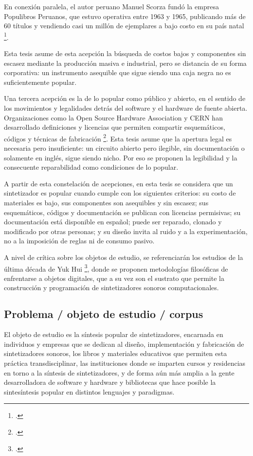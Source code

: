\documentclass[../candidatura.tex]{subfiles}
\begin{document}
En conexión paralela, el autor peruano Manuel Scorza fundó la empresa Populibros Peruanos, que estuvo operativa entre 1963 y 1965, publicando más de 60 títulos y vendiendo casi un millón de ejemplares a bajo costo en su país natal \footcite{aguirre_populibros_2017}.

Esta tesis asume de esta acepción la búsqueda de costos bajos y componentes sin escasez mediante la producción masiva e industrial, pero se distancia de su forma corporativa: un instrumento asequible que sigue siendo una caja negra no es suficientemente popular.

Una tercera acepción es la de lo popular como público y abierto, en el sentido de los movimientos y legalidades detrás del software y el hardware de fuente abierta. Organizaciones como la Open Source Hardware Association y CERN han desarrollado definiciones y licencias que permiten compartir esquemáticos, códigos y técnicas de fabricación \footcites{oshwa_about_sinfecha}{cern_ohl_sinfecha}. Esta tesis asume que la apertura legal es necesaria pero insuficiente: un circuito abierto pero ilegible, sin documentación o solamente en inglés, sigue siendo nicho. Por eso se proponen la legibilidad y la consecuente reparabilidad como condiciones de lo popular.

A partir de esta constelación de acepciones, en esta tesis se considera que un sintetizador es popular cuando cumple con los siguientes criterios: su costo de materiales es bajo, sus componentes son asequibles y sin escasez; sus esquemáticos, códigos y documentación se publican con licencias permisivas; su documentación está disponible en español; puede ser reparado, clonado y modificado por otras personas; y su diseño invita al ruido y a la experimentación, no a la imposición de reglas ni de consumo pasivo.

A nivel de crítica sobre los objetos de estudio, se referenciarán los estudios de la última década de Yuk Hui \footcites{hui_existence_2016}{hui_arte_2025}, donde se proponen metodologías filosóficas de enfrentarse a objetos digitales, que a su vez son el sustrato que permite la construcción y programación de sintetizadores sonoros computacionales.

\subsection{Problema / objeto de estudio / corpus}

El objeto de estudio es la síntesis popular de sintetizadores, encarnada en individuos y empresas que se dedican al diseño, implementación y fabricación de sintetizadores sonoros, los libros y materiales educativos que permiten esta práctica transdisciplinar, las instituciones donde se imparten cursos y residencias en torno a la síntesis de sintetizadores, y de forma aún más amplia a la gente desarrolladora de software y hardware y bibliotecas que hace posible la sintesíntesis popular en distintos lenguajes y paradigmas.
\end{document}

